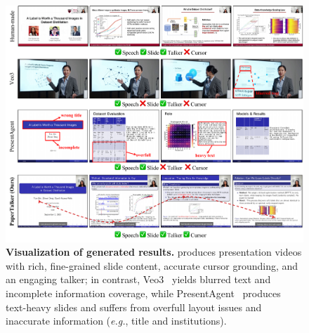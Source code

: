 \begin{figure}
    \centering
    \includegraphics[width=\linewidth]{figure/vis.pdf}
    \captionsetup{skip=0pt}  
    \caption{\textbf{Visualization of generated results.} {\agent} produces presentation videos with rich, fine-grained slide content, accurate cursor grounding, and an engaging talker; in contrast, Veo3~\cite{deepmind2025veo3} yields blurred text and incomplete information coverage, while PresentAgent~\cite{shi2025presentagent} produces text-heavy slides and suffers from overfull layout issues and inaccurate information (\textit{e.g.}, title and institutions).}
    \label{fig:compare}
    \vspace{-0.2\baselineskip} 
\end{figure}
